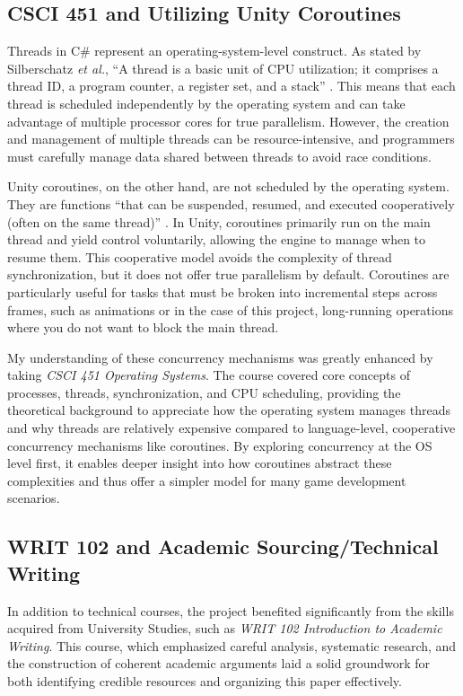 \documentclass[a4paper, 12pt, one column, aas_macros]{article}
\begin{document}
\subsection{CSCI 451 and Utilizing Unity Coroutines}
Threads in C\# represent an operating-system-level construct. As stated by Silberschatz \emph{et al.}, ``A thread is a basic unit of CPU utilization; it comprises a thread ID, a program counter, a register set, and a stack'' \cite{silberschatz}. This means that each thread is scheduled independently by the operating system and can take advantage of multiple processor cores for true parallelism. However, the creation and management of multiple threads can be resource-intensive, and programmers must carefully manage data shared between threads to avoid race conditions. 

Unity coroutines, on the other hand, are not scheduled by the operating system. They are functions ``that can be suspended, resumed, and executed cooperatively (often on the same thread)'' \cite{nosenko}. In Unity, coroutines primarily run on the main thread and yield control voluntarily, allowing the engine to manage when to resume them. This cooperative model avoids the complexity of thread synchronization, but it does not offer true parallelism by default. Coroutines are particularly useful for tasks that must be broken into incremental steps across frames, such as animations or in the case of this project, long-running operations where you do not want to block the main thread.

My understanding of these concurrency mechanisms was greatly enhanced by taking \textit{CSCI 451 Operating Systems}. The course covered core concepts of processes, threads, synchronization, and CPU scheduling, providing the theoretical background to appreciate how the operating system manages threads and why threads are relatively expensive compared to language-level, cooperative concurrency mechanisms like coroutines. By exploring concurrency at the OS level first, it enables deeper insight into how coroutines abstract these complexities and thus offer a simpler model for many game development scenarios.

\subsection{WRIT 102 and Academic Sourcing/Technical Writing}
In addition to technical courses, the project benefited significantly from the skills acquired from University Studies, such as \textit{WRIT 102 Introduction to Academic Writing}. This course, which emphasized careful analysis, systematic research, and the construction of coherent academic arguments laid a solid groundwork for both identifying credible resources and organizing this paper effectively.
\end{document}
